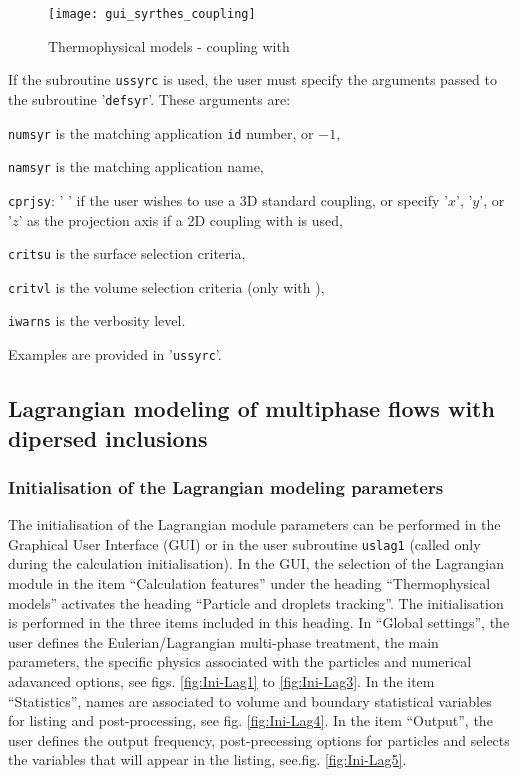 {{{\begin{figure}[ht]
\begin{center}
\texttt{[image: gui\_syrthes\_coupling]}
\caption{Thermophysical models - coupling with \syrthes}
\label{fig:syrthes}
\end{center}
\end{figure}

If the subroutine \texttt{ussyrc} is used, the user must specify the arguments 
passed to the subroutine '\texttt{defsyr}'. These arguments are:
\begin{list}{-}{}
 \item \texttt{numsyr} is the matching \syrthes application \texttt{id} number, or $-1$,
 \item \texttt{namsyr} is the matching \syrthes application name,
 \item \texttt{cprjsy}: ' ' if the user wishes to use a 3D standard coupling,
 or specify '$x$', '$y$', or '$z$' as the projection axis if a 2D coupling with \syrthes is used,
 \item \texttt{critsu} is the surface selection criteria,
 \item \texttt{critvl} is the volume selection criteria (only with ),
 \item \texttt{iwarns} is the verbosity level.
\end{list}
Examples are provided in '\texttt{ussyrc}'.


\subsection{Lagrangian modeling of multiphase flows with dipersed inclusions}

\subsubsection{Initialisation  of the Lagrangian
   modeling parameters}\label{sec:Ini-lag}

The initialisation of the Lagrangian module parameters can be performed in
 the Graphical User Interface (GUI) or in the user subroutine \texttt{uslag1} 
(called only during the calculation initialisation). In the GUI, the selection
 of the Lagrangian module in the item ``Calculation features'' under the heading
 ``Thermophysical models'' activates the heading ``Particle and droplets 
tracking''. The initialisation is performed in the three items included in 
this heading. In ``Global settings'', the user defines the Eulerian/Lagrangian 
multi-phase treatment, the main parameters, the specific physics associated with
 the particles and numerical adavanced options, see figs. \ref {fig:Ini-Lag1}
 to \ref {fig:Ini-Lag3}. In the item ``Statistics'', names are associated to 
volume and boundary statistical variables for listing and post-processing, 
see fig. \ref {fig:Ini-Lag4}. In the item ``Output'', the user defines the
 output frequency, post-precessing options for particles and selects the variables
 that will appear in the listing, see.fig. \ref {fig:Ini-Lag5}.

}}}
